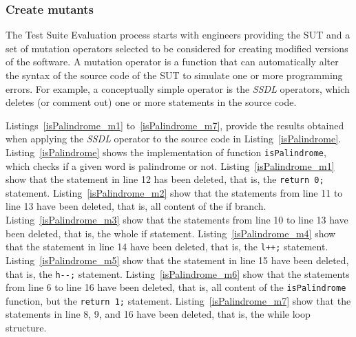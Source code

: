 \subsubsection{Create mutants}

The Test Suite Evaluation process starts with engineers providing the SUT and a set of mutation operators selected to be considered for creating modified versions of the software. 
A mutation operator is a function that can automatically alter the syntax of the source code of the SUT to simulate one or more programming errors.
For example, a conceptually simple operator is the \textit{SSDL} operators, which deletes (or comment out) one or more statements in the source code.



Listings~\ref{isPalindrome_m1} to~\ref{isPalindrome_m7}, provide the results obtained when applying the \textit{SSDL} operator to the source code in Listing~\ref{isPalindrome}.
Listing~\ref{isPalindrome} shows the implementation of function \texttt{isPalindrome}, which checks if a given word is palindrome or not.
Listing~\ref{isPalindrome_m1} show that the statement in line 12 has been deleted, that is, the \texttt{return 0;} statement.
Listing~\ref{isPalindrome_m2} show that the statements from line 11 to line 13 have been deleted, that is, all content of the if branch.
Listing~\ref{isPalindrome_m3} show that the statements from line 10 to line 13 have been deleted, that is, the whole if statement.
Listing~\ref{isPalindrome_m4} show that the statement in line 14 have been deleted, that is, the \texttt{l++;} statement.
Listing~\ref{isPalindrome_m5} show that the statement in line 15 have been deleted, that is, the \texttt{h-}\texttt{-;} statement.
Listing~\ref{isPalindrome_m6} show that the statements from line 6 to line 16 have been deleted, that is, all content of the \texttt{isPalindrome} function, but the \texttt{return 1;} statement.
Listing~\ref{isPalindrome_m7} show that the statements in line 8, 9, and 16 have been deleted, that is, the while loop structure.











